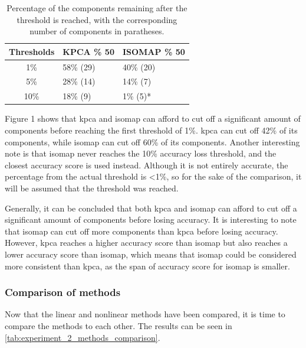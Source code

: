 \begin{table}[htb!]
    \centering
    \begin{tabular}{cp{}p{}}
        \toprule
        \textbf{Thresholds} & \textbf{KPCA \% 50} & \textbf{ISOMAP \% 50} \\
        \midrule
        1\% & 58\% (29) & 40\% (20) \\
        5\% & 28\% (14) & 14\% (7) \\ 
        10\% & 18\% (9) & 1\% (5)* \\
        \bottomrule
    \end{tabular}
    \caption{Percentage of the components remaining after the threshold is reached, with the corresponding number of components in paratheses.}
    \label{tab:experiment_2_non_linear_methods_comparison}
\end{table}

Figure 1 shows that \gls{kpca} and \gls{isomap} can afford to cut off a significant amount of components before reaching the first threshold of 1\%. \gls{kpca} can cut off 42\% of its components, while \gls{isomap} can cut off 60\% of its components. Another interesting note is that \gls{isomap} never reaches the 10\% accuracy loss threshold, and the closest accuracy score is used instead. Although it is not entirely accurate, the percentage from the actual threshold is <1\%, so for the sake of the comparison, it will be assumed that the threshold was reached.

Generally, it can be concluded that both \gls{kpca} and \gls{isomap} can afford to cut off a significant amount of components before losing accuracy. It is interesting to note that \gls{isomap} can cut off more components than \gls{kpca} before losing accuracy. However, \gls{kpca} reaches a higher accuracy score than \gls{isomap} but also reaches a lower accuracy score than \gls{isomap}, which means that \gls{isomap} could be considered more consistent than kpca, as the span of accuracy score for \gls{isomap} is smaller.


\subsubsection{Comparison of methods}
Now that the linear and nonlinear methods have been compared, it is time to compare the methods to each other. The results can be seen in \autoref{tab:experiment_2_methods_comparison}.


